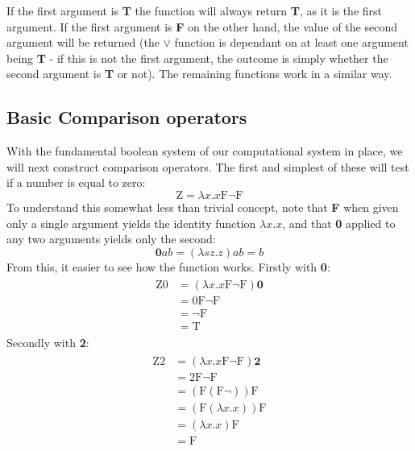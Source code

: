 \documentclass[Master.tex]{subfiles}
\begin{document}
If the first argument is \textbf{T} the function will always return \textbf{T}, as it is the first argument. If the first argument is \textbf{F} on the other hand, the value of the second argument will be returned (the $\vee$ function is dependant on at least one argument being \textbf{T} - if this is not the first argument, the outcome is simply whether the second argument is \textbf{T} or not). The remaining functions work in a similar way.

\subsection{Basic Comparison operators}

With the fundamental boolean system of our computational system in place, we will next construct comparison operators. The first and simplest of these will test if a number is equal to zero:
\cite{rojas2015lambdatutorial}
\begin{equation*}
\bm{\mathrm{Z}} = \lambda x.x\bm{\mathrm{F\lnot F}}
\end{equation*}
To understand this somewhat less than trivial concept, note that \textbf{F} when given only a single argument yields the identity function $\lambda x.x$, and that \textbf{0} applied to any two arguments yields only the second:
\cite{rojas2015lambdatutorial}
\begin{equation*}
\bm{0}ab = (\lambda sz.z)ab = b
\end{equation*}
From this, it easier to see how the function works. Firstly with \textbf{0}:
\cite{rojas2015lambdatutorial}
\begin{gather*}
\begin{aligned}
\bm{\mathrm{Z0}} &= (\lambda x.x\bm{\mathrm{F\lnot F}})\bm{0}\\
&= \bm{\mathrm{0F\lnot F}}\\
&= \bm{\mathrm{\lnot F}}\\
&= \bm{\mathrm{T}}
\end{aligned}
\end{gather*}
Secondly with \textbf{2}:
\begin{gather*}
\begin{aligned}
\bm{\mathrm{Z2}} &= (\lambda x.x\bm{\mathrm{F\lnot F}})\bm{2}\\
&= \bm{\mathrm{2F\lnot F}}\\
&= (\bm{\mathrm{F}}(\bm{\mathrm{F}}\lnot)) \bm{\mathrm{F}}\\
&= (\bm{\mathrm{F}}(\lambda x.x))\bm{\mathrm{F}}\\
&= (\lambda x.x)\bm{\mathrm{F}}\\
&= \bm{\mathrm{F}} 
\end{aligned}
\end{gather*}
\end{document}
